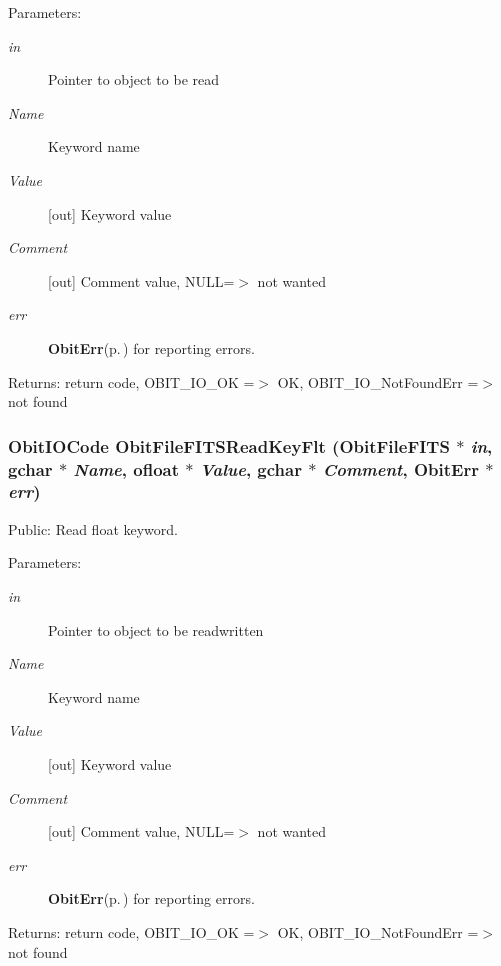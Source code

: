 \begin{Desc}
\item[Parameters:]
\begin{description}
\item[{\em in}]Pointer to object to be read \item[{\em Name}]Keyword name \item[{\em Value}][out] Keyword value \item[{\em Comment}][out] Comment value, NULL=$>$ not wanted \item[{\em err}]{\bf Obit\-Err}{\rm (p.\,\pageref{structObitErr})} for reporting errors. \end{description}
\end{Desc}
\begin{Desc}
\item[Returns:]return code, OBIT\_\-IO\_\-OK =$>$ OK, OBIT\_\-IO\_\-Not\-Found\-Err =$>$ not found \end{Desc}
\subsubsection{\setlength{\rightskip}{0pt plus 5cm}Obit\-IOCode Obit\-File\-FITSRead\-Key\-Flt ({\bf Obit\-File\-FITS} $\ast$ {\em in}, gchar $\ast$ {\em Name}, {\bf ofloat} $\ast$ {\em Value}, gchar $\ast$ {\em Comment}, {\bf Obit\-Err} $\ast$ {\em err})}\label{ObitFileFITS_8h_a15}


Public: Read float keyword. 

\begin{Desc}
\item[Parameters:]
\begin{description}
\item[{\em in}]Pointer to object to be readwritten \item[{\em Name}]Keyword name \item[{\em Value}][out] Keyword value \item[{\em Comment}][out] Comment value, NULL=$>$ not wanted \item[{\em err}]{\bf Obit\-Err}{\rm (p.\,\pageref{structObitErr})} for reporting errors. \end{description}
\end{Desc}
\begin{Desc}
\item[Returns:]return code, OBIT\_\-IO\_\-OK =$>$ OK, OBIT\_\-IO\_\-Not\-Found\-Err =$>$ not found \end{Desc}
